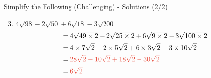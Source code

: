 \documentclass[aspectratio=169]{beamer}
\begin{document}
\begin{frame}{Simplify the Following (Challenging) - Solutions (2/2)}
\begin{tcolorbox}[colback=lightgray,colframe=primary,title=Full Solutions]
\footnotesize
\begin{enumerate}
  \setcounter{enumi}{2}
  \item $4\sqrt{98} - 2\sqrt{50} + 6\sqrt{18} - 3\sqrt{200}$
  \begin{align*}
    &= 4\sqrt{49 \times 2} - 2\sqrt{25 \times 2} + 6\sqrt{9 \times 2} - 3\sqrt{100 \times 2} \\
    &= 4 \times 7\sqrt{2} - 2 \times 5\sqrt{2} + 6 \times 3\sqrt{2} - 3 \times 10\sqrt{2} \\
    &= \textcolor{accent}{28\sqrt{2} - 10\sqrt{2} + 18\sqrt{2} - 30\sqrt{2}} \\
    &= \textcolor{accent}{6\sqrt{2}}
  \end{align*}
\end{enumerate}
\end{tcolorbox}
\end{frame}
\end{document}
